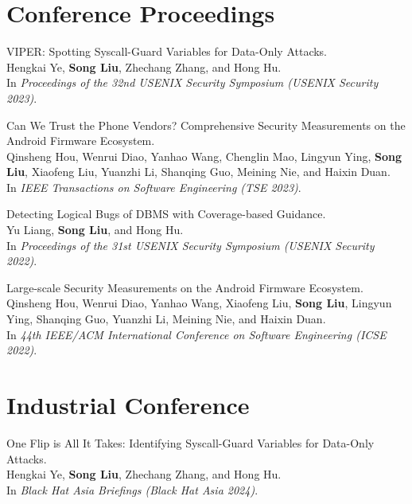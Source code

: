 \documentclass[letterpaper,10pt]{article}
\newcommand{\shorterSection}[1]{\vspace{-10pt}\section{#1}}
\begin{document}
\shorterSection{\textcolor{titleblue}{Conference Proceedings}}
  \begin{enumerate}[label={[\arabic*]}]


    \item VIPER: Spotting Syscall-Guard Variables for Data-Only Attacks. \\
          Hengkai Ye, \textbf{Song Liu}, Zhechang Zhang, and Hong Hu. \\
          In \textit{Proceedings of the 32nd USENIX Security Symposium (USENIX Security 2023)}.

    \item Can We Trust the Phone Vendors? Comprehensive Security Measurements on the Android Firmware Ecosystem. \\
          Qinsheng Hou, Wenrui Diao, Yanhao Wang, Chenglin Mao, Lingyun Ying, \textbf{Song Liu}, Xiaofeng Liu, Yuanzhi Li, Shanqing Guo, Meining Nie, and Haixin Duan. \\
          In \textit{IEEE Transactions on Software Engineering (TSE 2023)}.
      
    \item Detecting Logical Bugs of DBMS with Coverage-based Guidance. \\
          Yu Liang, \textbf{Song Liu}, and Hong Hu. \\
          In \textit{Proceedings of the 31st USENIX Security Symposium (USENIX Security 2022)}.

    \item Large-scale Security Measurements on the Android Firmware Ecosystem. \\
          Qinsheng Hou, Wenrui Diao, Yanhao Wang, Xiaofeng Liu, \textbf{Song Liu}, Lingyun Ying, Shanqing Guo, Yuanzhi Li, Meining Nie, and Haixin Duan. \\
          In \textit{44th IEEE/ACM International Conference on Software Engineering (ICSE 2022)}.

  \end{enumerate}

\shorterSection{\textcolor{titleblue}{Industrial Conference}}
  \begin{enumerate}[label={[\arabic*]}]
    \item One Flip is All It Takes: Identifying Syscall-Guard Variables for Data-Only Attacks. \\
          Hengkai Ye, \textbf{Song Liu}, Zhechang Zhang, and Hong Hu. \\
          In \textit{Black Hat Asia Briefings (Black Hat Asia 2024)}.
  \end{enumerate}
\end{document}
